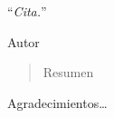 \documentclass[
11pt, %
spanish, %
singlespacing, %
headsepline, %
]{MastersDoctoralThesis} %
\begin{document}

\vspace*{0.2\textheight}

\noindent\enquote{\itshape Cita.}\bigbreak

\hfill Autor


\begin{abstract}
\addchaptertocentry{\abstractname} %
Resumen
\end{abstract}


\begin{acknowledgements}
\addchaptertocentry{\acknowledgementname} %
Agradecimientos\ldots
\end{acknowledgements}


\tableofcontents %

\listoffigures %

\listoftables %

\end{document}
